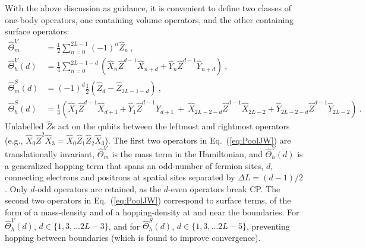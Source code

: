 \documentclass[aps, pra, onecolumn, tightenlines, letterpaper, amsmath, amssymb, preprintnumbers, floatfix, longbibliography, nofootinbib]{revtex4-2}
\begin{document}
With the above discussion as guidance, 
it is convenient to define two classes of one-body operators, 
one containing volume operators, 
and the other containing surface operators: 
%
\begin{align}
\hat{\Theta}_m^V &=   \frac{1}{2}\sum_{n=0}^{2L-1} (-1)^{n} \hat Z_n \ , \nonumber \\
\hat{\Theta}_{h}^V(d) &= \frac{1}{4}\sum_{n=0}^{2L-1-d} \left (\hat X_n \hat Z^{d-1} \hat X_{n+d} 
+ \hat Y_n \hat Z^{d-1} \hat Y_{n+d} \right ) \ ,  \nonumber \\
\hat{\Theta}_{m}^S(d) &= (-1)^d \frac{1}{2}\left ( \hat Z_d - \hat Z_{2L-1-d} \right ) 
\ , \nonumber \\
\hat{\Theta}_{h}^S(d) &= \frac{1}{4}\left (\hat X_1\hat Z^{d-1}\hat X_{d+1} + \hat Y_1\hat Z^{d-1}\hat Y_{d+1} 
\ + \  \hat X_{2L-2-d}\hat Z^{d-1}\hat X_{2L-2} + \hat Y_{2L-2-d}\hat Z^{d-1}\hat Y_{2L-2}\right )
\ .
\label{eq:PoolJW}
\end{align}
%
Unlabelled $\hat Z$s 
act on the qubits between the
leftmost and rightmost operators
(e.g., $\hat X_0 \hat Z^2 \hat X_3 = \hat X_0 \hat Z_1 \hat Z_2 \hat X_3$).
The first two operators in Eq.~(\ref{eq:PoolJW}) are translationally invariant,
$\hat{\Theta}_m^V$ is the mass term in the Hamiltonian,
and 
$\hat{\Theta}_{h}^V(d)$ is a generalized hopping term that spans an odd-number of fermion sites, $d$, connecting electrons and positrons at spatial sites separated by $\Delta L = (d-1)/2$. 
Only $d$-odd operators are retained, as the $d$-even operators break CP.
The second two operators in Eq.~(\ref{eq:PoolJW})
correspond to surface terms, of the form of a mass-density 
and of a hopping-density at and near the boundaries.
For $\hat{\Theta}_h^V(d)$, $d\in \{1,3,\ldots 2L-3\}$, and for  $\hat{\Theta}_{h}^S(d)$, $d\in \{1,3,\ldots 2L-5\}$,
preventing hopping between boundaries (which is found to improve convergence).
\end{document}
